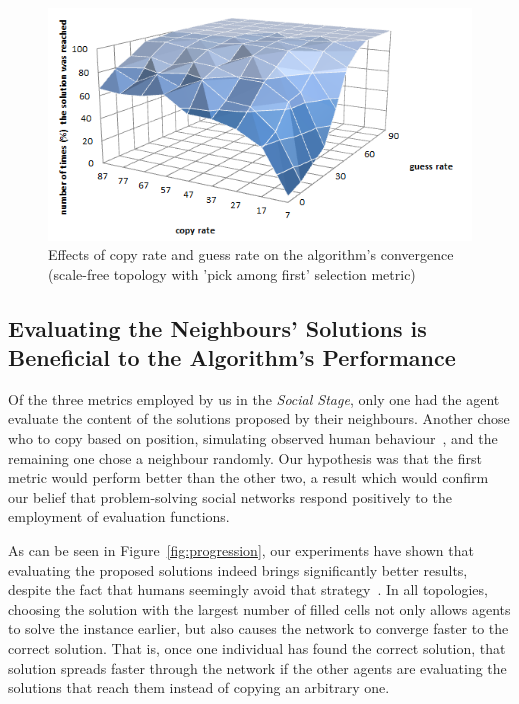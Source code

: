\documentclass{article}
\begin{document}
\begin{figure}
\includegraphics[scale=0.60]{copy_guess_free_prob_num_solution_reached}
\caption{Effects of copy rate and guess rate on the algorithm's convergence (scale-free topology with 'pick among first' selection metric)
}
\label{fig:copy_guess_free_prob_num_solution_reached}
\end{figure}

\subsection{Evaluating the Neighbours' Solutions is Beneficial to the Algorithm's Performance}

Of the three metrics employed by us in the \emph{Social Stage}, only one had the agent evaluate the content of the solutions proposed by their neighbours. Another chose who to copy based on position, simulating observed human behaviour~\cite{farenzena:collabem}, and the remaining one chose a neighbour randomly. Our hypothesis was that the first metric would perform better than the other two, a result which would confirm our belief that problem-solving social networks respond positively to the employment of evaluation functions.

As can be seen in Figure~\ref{fig:progression}, our experiments have shown that evaluating the proposed solutions indeed brings significantly better results, despite the fact that humans seemingly avoid that strategy~\cite{farenzena:collabem}. In all topologies, choosing the solution with the largest number of filled cells not only allows agents to solve the instance earlier, but also causes the network to converge faster to the correct solution. That is, once one individual has found the correct solution, that solution spreads faster through the network if the other agents are evaluating the solutions that reach them instead of copying an arbitrary one.
\end{document}
